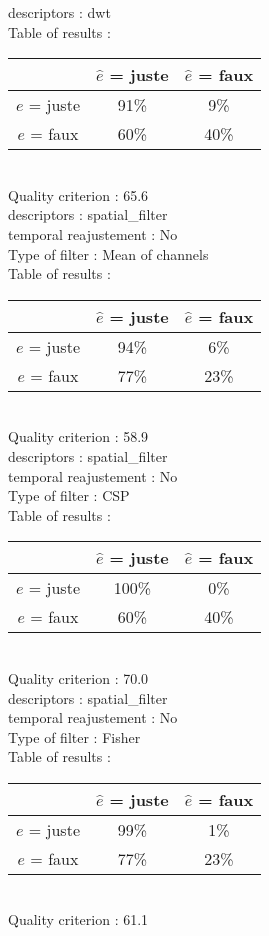 descriptors : dwt \\
Table of results : \\
\begin{tabular}{|c|c|c|}
\hline				& $\hat{e}$ = juste & $\hat{e}$ = faux \\
\hline  $e$ = juste	&     91\%			&      9\%		\\
\hline  $e$ = faux	&     60\%			&     40\%		\\
\hline
\end{tabular}\\
Quality criterion :   65.6 \\

descriptors : spatial_filter \\
temporal reajustement : No \\
Type of filter : Mean of channels \\
Table of results : \\
\begin{tabular}{|c|c|c|}
\hline				& $\hat{e}$ = juste & $\hat{e}$ = faux \\
\hline  $e$ = juste	&     94\%			&      6\%		\\
\hline  $e$ = faux	&     77\%			&     23\%		\\
\hline
\end{tabular}\\
Quality criterion :   58.9 \\

descriptors : spatial_filter \\
temporal reajustement : No \\
Type of filter : CSP \\
Table of results : \\
\begin{tabular}{|c|c|c|}
\hline				& $\hat{e}$ = juste & $\hat{e}$ = faux \\
\hline  $e$ = juste	&    100\%			&      0\%		\\
\hline  $e$ = faux	&     60\%			&     40\%		\\
\hline
\end{tabular}\\
Quality criterion :   70.0 \\

descriptors : spatial_filter \\
temporal reajustement : No \\
Type of filter : Fisher \\
Table of results : \\
\begin{tabular}{|c|c|c|}
\hline				& $\hat{e}$ = juste & $\hat{e}$ = faux \\
\hline  $e$ = juste	&     99\%			&      1\%		\\
\hline  $e$ = faux	&     77\%			&     23\%		\\
\hline
\end{tabular}\\
Quality criterion :   61.1 \\


